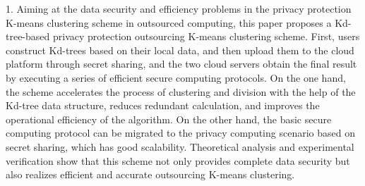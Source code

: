 \begin{eabstract}
1. Aiming at the data security and efficiency problems in the privacy protection K-means clustering scheme in outsourced computing, this paper proposes a Kd-tree-based privacy protection outsourcing K-means clustering scheme. First, users construct Kd-trees based on their local data, and then upload them to the cloud platform through secret sharing, and the two cloud servers obtain the final result by executing a series of efficient secure computing protocols. On the one hand, the scheme accelerates the process of clustering and division with the help of the Kd-tree data structure, reduces redundant calculation, and improves the operational efficiency of the algorithm. On the other hand, the basic secure computing protocol can be migrated to the privacy computing scenario based on secret sharing, which has good scalability. Theoretical analysis and experimental verification show that this scheme not only provides complete data security but also realizes efficient and accurate outsourcing K-means clustering.


\end{eabstract}
